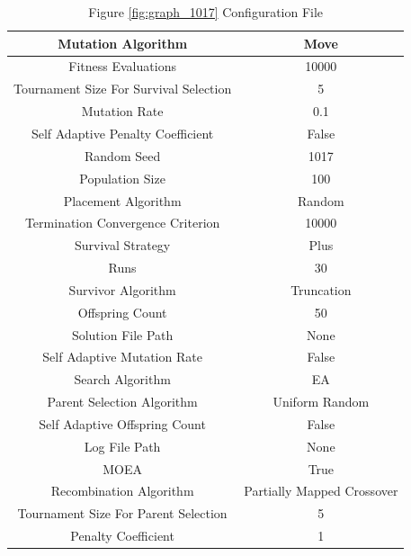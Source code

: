\documentclass{standalone}
\begin{document}
\begin{table}[!htb]
	\centering
	\caption{Figure \ref{fig:graph_1017} Configuration File}
	\label{tab:graph_1017}
	\begin{tabular}{| c | c |}
		\hline
		Mutation Algorithm		& Move		 \\
		\hline
		Fitness Evaluations		& 10000		 \\
		\hline
		Tournament Size For Survival Selection		& 5		 \\
		\hline
		Mutation Rate		& 0.1		 \\
		\hline
		Self Adaptive Penalty Coefficient		& False		 \\
		\hline
		Random Seed		& 1017		 \\
		\hline
		Population Size		& 100		 \\
		\hline
		Placement Algorithm		& Random		 \\
		\hline
		Termination Convergence Criterion		& 10000		 \\
		\hline
		Survival Strategy		& Plus		 \\
		\hline
		Runs		& 30		 \\
		\hline
		Survivor Algorithm		& Truncation		 \\
		\hline
		Offspring Count		& 50		 \\
		\hline
		Solution File Path		& None		 \\
		\hline
		Self Adaptive Mutation Rate		& False		 \\
		\hline
		Search Algorithm		& EA		 \\
		\hline
		Parent Selection Algorithm		& Uniform Random		 \\
		\hline
		Self Adaptive Offspring Count		& False		 \\
		\hline
		Log File Path		& None		 \\
		\hline
		MOEA		& True		 \\
		\hline
		Recombination Algorithm		& Partially Mapped Crossover		 \\
		\hline
		Tournament Size For Parent Selection		& 5		 \\
		\hline
		Penalty Coefficient		& 1		 \\
		\hline
	\end{tabular}
\end{table}
\end{document}
